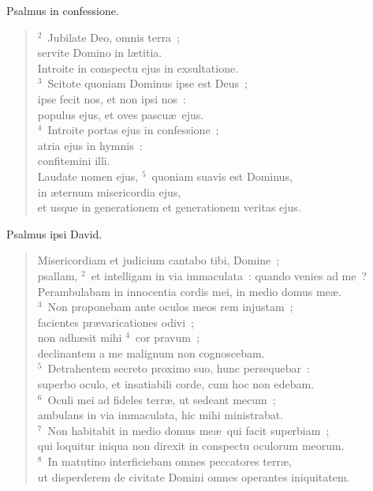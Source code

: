 \lettrine[lines=3,image=true,loversize=0.05,lraise=-0.03]{P}{}salmus in confessione.
\begin{flushleft}\begin{verse}\vspace{6pt}${}^{2}$~Jubilate Deo, omnis terra~;\\ servite Domino in l\ae titia.\\ Introite in conspectu ejus in exsultatione.\\
${}^{3}$~Scitote quoniam Dominus ipse est Deus~;\\ ipse fecit nos, et non ipsi nos~:\\ populus ejus, et oves pascu\ae\ ejus.\\
${}^{4}$~Introite portas ejus in confessione~;\\ atria ejus in hymnis~:\\ confitemini illi.\\ Laudate nomen ejus,
${}^{5}$~quoniam suavis est Dominus,\\ in \ae ternum misericordia ejus,\\ et usque in generationem et generationem veritas ejus.\end{verse}\end{flushleft}



\lettrine[lines=3,image=true,loversize=0.05,lraise=-0.03]{P}{}salmus ipsi David. \begin{flushleft}\begin{verse}\vspace{6pt}Misericordiam et judicium cantabo tibi, Domine~;\\ psallam,
${}^{2}$~et intelligam in via immaculata~: quando venies ad me~?\\ Perambulabam in innocentia cordis mei, in medio domus me\ae .\\
${}^{3}$~Non proponebam ante oculos meos rem injustam~;\\ facientes pr\ae varicationes odivi~;\\ non adh\ae sit mihi
${}^{4}$~cor pravum~;\\ declinantem a me malignum non cognoscebam.\\
${}^{5}$~Detrahentem secreto proximo suo, hunc persequebar~:\\ superbo oculo, et insatiabili corde, cum hoc non edebam.\\
${}^{6}$~Oculi mei ad fideles terr\ae , ut sedeant mecum~;\\ ambulans in via immaculata, hic mihi ministrabat.\\
${}^{7}$~Non habitabit in medio domus me\ae\ qui facit superbiam~;\\ qui loquitur iniqua non direxit in conspectu oculorum meorum.\\
${}^{8}$~In matutino interficiebam omnes peccatores terr\ae ,\\ ut disperderem de civitate Domini omnes operantes iniquitatem.\end{verse}\end{flushleft}



